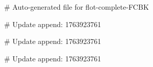 # Auto-generated file for flot-complete-FCBK

# Update append: 1763923761

# Update append: 1763923761

# Update append: 1763923761
